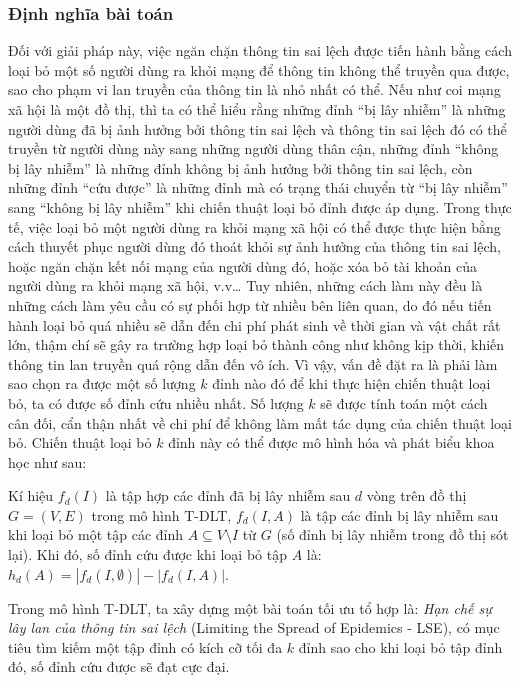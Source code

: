  	\subsubsection{Định nghĩa bài toán}
 	Đối với giải pháp này, việc ngăn chặn thông tin sai lệch được tiến hành bằng cách loại bỏ một số người dùng ra khỏi mạng để thông tin không thể truyền qua được, sao cho phạm vi lan truyền của thông tin là nhỏ nhất có thể. Nếu như coi mạng xã hội là một đồ thị, thì ta có thể hiểu rằng những đỉnh “bị lây nhiễm” là những người dùng đã bị ảnh hưởng bởi thông tin sai lệch và thông tin sai lệch đó có thể truyền từ người dùng này sang những người dùng thân cận, những đỉnh “không bị lây nhiễm” là những đỉnh không bị ảnh hưởng bởi thông tin sai lệch, còn những đỉnh “cứu được” là những đỉnh mà có trạng thái chuyển từ “bị lây nhiễm” sang “không bị lây nhiễm” khi chiến thuật loại bỏ đỉnh được áp dụng. Trong thực tế, việc loại bỏ một người dùng ra khỏi mạng xã hội có thể được thực hiện bằng cách thuyết phục người dùng đó thoát khỏi sự ảnh hưởng của thông tin sai lệch, hoặc ngăn chặn kết nối mạng của người dùng đó, hoặc xóa bỏ tài khoản của người dùng ra khỏi mạng xã hội, v.v… Tuy nhiên, những cách làm này đều là những cách làm yêu cầu có sự phối hợp từ nhiều bên liên quan, do đó nếu tiến hành loại bỏ quá nhiều sẽ dẫn đến chi phí phát sinh về thời gian và vật chất rất lớn, thậm chí sẽ gây ra trường hợp loại bỏ thành công như không kịp thời, khiến thông tin lan truyền quá rộng dẫn đến vô ích. Vì vậy, vấn đề đặt ra là phải làm sao chọn ra được một số lượng $k$ đỉnh nào đó để khi thực hiện chiến thuật loại bỏ, ta có được số đỉnh cứu nhiều nhất. Số lượng $k$ sẽ được tính toán một cách cân đối, cẩn thận nhất về chi phí để không làm mất tác dụng của chiến thuật loại bỏ. Chiến thuật loại bỏ $k$ đỉnh này có thể được mô hình hóa và phát biểu khoa học như sau:  
 	
 	Kí hiệu $f_{d}(I)$ là tập hợp các đỉnh đã bị lây nhiễm sau $d$ vòng trên đồ thị $G = (V,E)$ trong mô hình T-DLT, $f_{d}(I,A)$ là tập các đỉnh bị lây nhiễm sau khi loại bỏ một tập các đỉnh $A \subseteq V \setminus I$ từ $G$ (số đỉnh bị lây nhiễm trong đồ thị sót lại). Khi đó, số đỉnh cứu được khi loại bỏ tập $A$ là: $h_{d}(A)=| f_{d}(I,\emptyset)|-|f_{d}(I,A)|$.
 	
 	Trong mô hình T-DLT, ta xây dựng một bài toán tối ưu tổ hợp là: {\itshape Hạn chế sự lây lan của thông tin sai lệch} (Limiting the Spread of Epidemics - LSE), có mục tiêu tìm kiếm một tập đỉnh có kích cỡ tối đa $k$ đỉnh sao cho khi loại bỏ tập đỉnh đó, số đỉnh cứu được sẽ đạt cực đại.  
 	
